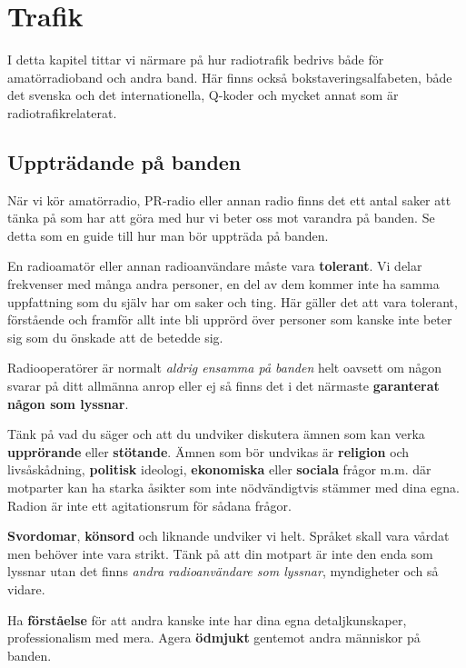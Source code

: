 
\chapter{Trafik}

I detta kapitel tittar vi närmare på hur radiotrafik bedrivs både för
amatörradioband och andra band. Här finns också bokstaveringsalfabeten, både
det svenska och det internationella, Q-koder och mycket annat som är
radio\-trafik\-relaterat.

\clearpage

\section{Uppträdande på banden}

När vi kör amatörradio, PR-radio eller annan radio finns det ett antal saker
att tänka på som har att göra med hur vi beter oss mot varandra på banden. Se
detta som en guide till hur man bör uppträda på banden.

En radioamatör eller annan radioanvändare måste vara \textbf{tolerant}. Vi
delar frekvenser med många andra personer, en del av dem kommer inte ha samma
uppfattning som du själv har om saker och ting. Här gäller det att vara
tolerant, förstående och framför allt inte bli upprörd över personer som
kanske inte beter sig som du önskade att de betedde sig.

Radiooperatörer är normalt \emph{aldrig ensamma på banden} helt oavsett om
någon svarar på ditt allmänna anrop eller ej så finns det i det närmaste
\textbf{garanterat någon som lyssnar}.

Tänk på vad du säger och att du undviker diskutera ämnen som kan verka
\textbf{upprörande} eller \textbf{stötande}. Ämnen som bör undvikas är
\textbf{religion} och livs\-å\-skå\-d\-ni\-ng, \textbf{politisk} ideologi,
\textbf{ekonomiska} eller \textbf{sociala} frågor m.m. där motparter kan ha
starka åsikter som inte nödvändigtvis stämmer med dina egna. Radion är inte
ett agitationsrum för sådana frågor.

\textbf{Svordomar}, \textbf{könsord} och liknande undviker vi helt. Språket
skall vara vårdat men behöver inte vara strikt. Tänk på att din motpart är
inte den enda som lyssnar utan det finns \textit{andra radioanvändare som
  lyssnar}, myndigheter och så vidare.

Ha \textbf{förståelse} för att andra kanske inte har dina egna
detaljkunskaper, professionalism med mera. Agera \textbf{ödmjukt} gentemot
andra människor på banden.

